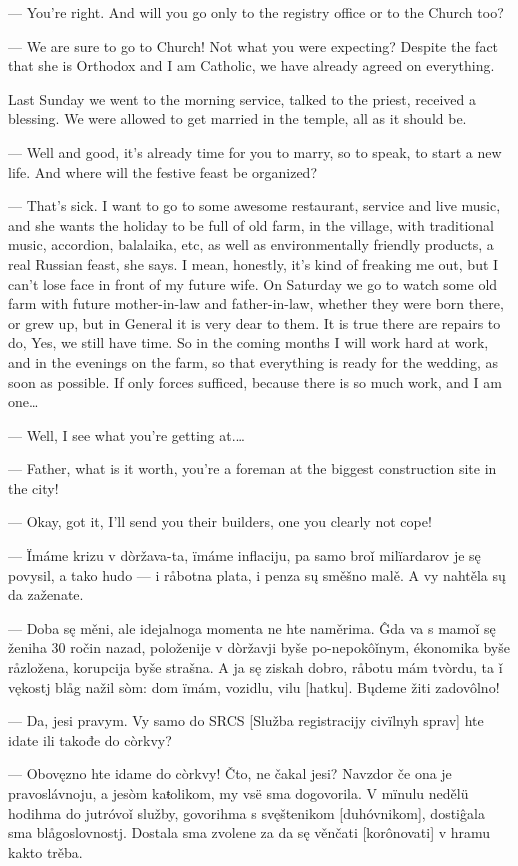 — You’re right. And will you go only to the registry office or to the Church too?

— We are sure to go to Church! Not what you were expecting? Despite the fact that she is Orthodox and I am Catholic, we have already agreed on everything. 

Last Sunday we went to the morning service, talked to the priest, received a blessing. We were allowed to get married in the temple, all as it should be.

— Well and good, it’s already time for you to marry, so to speak, to start a new life. And where will the festive feast be organized?

— That’s sick. I want to go to some awesome restaurant, service and live music, and she wants the holiday to be full of old farm, in the village, with traditional music, accordion, balalaika, etc, as well as environmentally friendly products, a real Russian feast, she says. I mean, honestly, it’s kind of freaking me out, but I can’t lose face in front of my future wife. On Saturday we go to watch some old farm with future mother-in-law and father-in-law, whether they were born there, or grew up, but in General it is very dear to them. It is true there are repairs to do, Yes, we still have time. So in the coming months I will work hard at work, and in the evenings on the farm, so that everything is ready for the wedding, as soon as possible. If only forces sufficed, because there is so much work, and I am one…

— Well, I see what you’re getting at.…

— Father, what is it worth, you’re a foreman at the biggest construction site in the city!

— Okay, got it, I’ll send you their builders, one you clearly not cope!


— Ïmáme krizu v dòržava-ta, ïmáme inflaciju, pa samo broǐ milïardarov je sę povysil, a tako hudo — i råbotna plata, i penza sų směšno malě. A vy nahtěla sų da zaženate.

— Doba sę měni, ale idejalnoga momenta ne hte naměrima. Ĝda va s mamoǐ sę ženiha 30 ročin nazad, položenije v dòržavji byše po-nepokôǐnym, ékonomika byše råzložena, korupcija byše strašna. A ja sę ziskah dobro, råbotu mám tvòrdu, ta ǐ vękostj blåg nažil sòm: dom ïmám, vozidlu, vilu [hatku]. Bųdeme žiti zadovôlno!

— Da, jesi pravym. Vy samo do SRCS [Služba registracijy civïlnyh sprav] hte idate ili takođe do còrkvy?

— Obovęzno hte idame do còrkvy! Čto, ne čakal jesi? Navzdor če ona je pravoslávnoju, a jesòm kaŧolikom, my vsë sma dogovorila. V mïnulu nedělü hodihma do jutróvoǐ služby, govorihma s svęštenikom [duhóvnikom], dostiĝala sma blågoslovnostj. Dostala sma zvolene za da sę věnčati [korônovati] v hramu kakto trěba.

